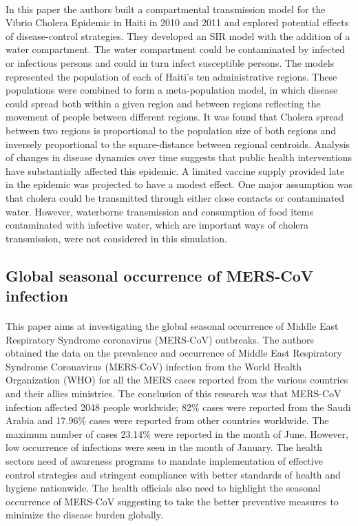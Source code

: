 \documentclass[12pt, a4paper]{extarticle}
\begin{document}
            \paragraph{} In this paper the authors built a compartmental transmission model for the Vibrio Cholera Epidemic in Haiti in 2010 and 2011 and explored potential effects of disease-control strategies. They developed an SIR model with the addition of a water compartment. The water compartment could be contaminated by infected or infectious persons and could in turn infect susceptible persons. The models represented the population of each of Haiti’s ten administrative regions. These populations were combined to form a meta-population model, in which disease could spread both within a given region and between regions reflecting the movement of people between different regions. It was found that Cholera spread between two regions is proportional to the population size of both regions and inversely proportional to the square-distance between regional centroids. Analysis of changes in disease dynamics over time suggests that public health interventions have substantially affected this epidemic. A limited vaccine supply provided late in the epidemic was projected to have a modest effect. One major assumption was that cholera could be transmitted through either close contacts or contaminated water. However, waterborne transmission and consumption of food items contaminated with infective water, which are important ways of cholera transmission, were not considered in this simulation.
        \subsection{Global seasonal occurrence of MERS-CoV infection}
            \paragraph{} This paper aims at investigating the global seasonal occurrence of Middle East Respiratory Syndrome coronavirus (MERS-CoV) outbreaks. The authors obtained the data on the prevalence and occurrence of Middle East Respiratory Syndrome Coronavirus (MERS-CoV) infection from the World Health Organization (WHO) for all the MERS cases reported from the various countries and their allies ministries. The conclusion of this research was that MERS-CoV infection affected 2048 people worldwide; 82\% cases were reported from the Saudi Arabia and 17.96\% cases were reported from other countries worldwide. The maximum number of cases 23.14\% were reported in the month of June. However, low occurrence of infections were seen in the month of January. The health sectors need of awareness programs to mandate implementation of effective control strategies and stringent compliance with better standards of health and hygiene nationwide. The health officials also need to highlight the seasonal occurrence of MERS-CoV suggesting to take the better preventive measures to minimize the disease burden globally.
\end{document}
